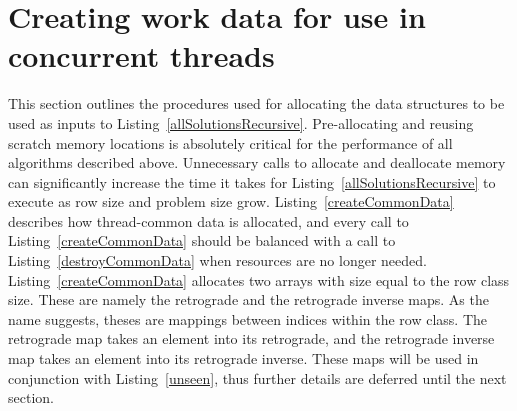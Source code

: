 \section{Creating work data for use in concurrent threads}

This section outlines the procedures used for allocating the data structures to be used as inputs to Listing~\ref{allSolutionsRecursive}. Pre-allocating and reusing scratch memory locations is absolutely critical for the performance of all algorithms described above. Unnecessary calls to allocate and deallocate memory can significantly increase the time it takes for Listing~\ref{allSolutionsRecursive} to execute as row size and problem size grow. Listing~\ref{createCommonData} describes how thread-common data is allocated, and every call to Listing~\ref{createCommonData} should be balanced with a call to Listing~\ref{destroyCommonData} when resources are no longer needed. Listing~\ref{createCommonData} allocates two arrays with size equal to the row class size. These are namely the retrograde and the retrograde inverse maps. As the name suggests, theses are mappings between indices within the row class. The retrograde map takes an element into its retrograde, and the retrograde inverse map takes an element into its retrograde inverse. These maps will be used in conjunction with Listing~\ref{unseen}, thus further details are deferred until the next section.

